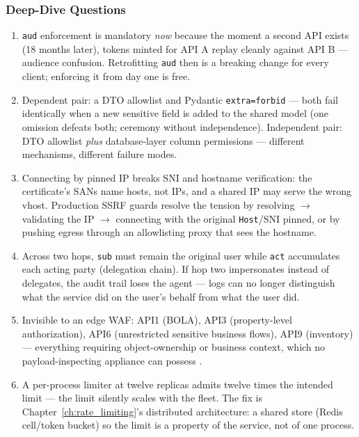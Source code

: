 \subsubsection*{Deep-Dive Questions}

\begin{enumerate}[label=\textbf{D16.\arabic*.}, leftmargin=2.8em]
  \item \texttt{aud} enforcement is mandatory \emph{now} because the moment
    a second API exists (18 months later), tokens minted for API A replay
    cleanly against API B --- audience confusion. Retrofitting
    \texttt{aud} then is a breaking change for every client; enforcing it
    from day one is free.
  \item Dependent pair: a DTO allowlist and Pydantic \texttt{extra=forbid}
    --- both fail identically when a new sensitive field is added to the
    shared model (one omission defeats both; ceremony without independence).
    Independent pair: DTO allowlist \emph{plus} database-layer column
    permissions --- different mechanisms, different failure modes.
  \item Connecting by pinned IP breaks SNI and hostname verification: the
    certificate's SANs name hosts, not IPs, and a shared IP may serve the
    wrong vhost. Production SSRF guards resolve the tension by resolving
    $\to$ validating the IP $\to$ connecting with the original
    \texttt{Host}/SNI pinned, or by pushing egress through an allowlisting
    proxy that sees the hostname.
  \item Across two hops, \texttt{sub} must remain the original user while
    \texttt{act} accumulates each acting party (delegation chain). If hop
    two impersonates instead of delegates, the audit trail loses the agent
    --- logs can no longer distinguish what the service did on the user's
    behalf from what the user did.
  \item Invisible to an edge WAF: API1 (BOLA), API3 (property-level
    authorization), API6 (unrestricted sensitive business flows), API9
    (inventory) --- everything requiring object-ownership or business
    context, which no payload-inspecting appliance can possess
    \cite{owaspapisecurity}.
  \item A per-process limiter at twelve replicas admits twelve times the
    intended limit --- the limit silently scales with the fleet. The fix is
    Chapter~\ref{ch:rate_limiting}'s distributed architecture: a shared
    store (Redis cell/token bucket) so the limit is a property of the
    service, not of one process.
\end{enumerate}

